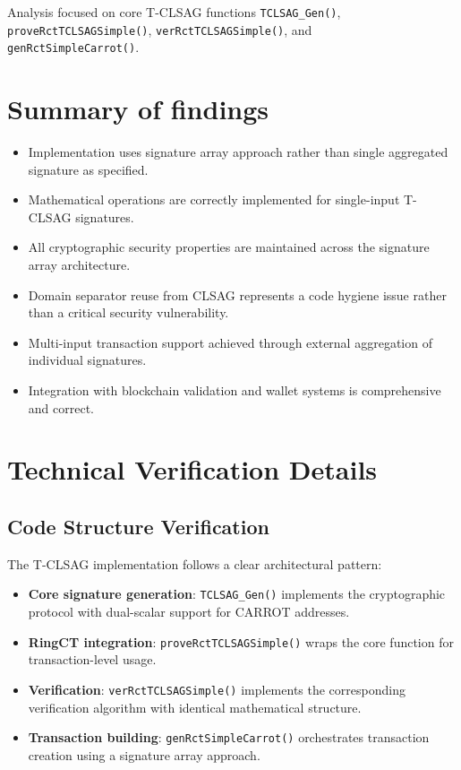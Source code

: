 \documentclass{article}
\begin{document}
Analysis focused on core T-CLSAG functions \texttt{TCLSAG\_Gen()}, \\
\texttt{proveRctTCLSAGSimple()}, \texttt{verRctTCLSAGSimple()}, and \\
\texttt{genRctSimpleCarrot()}.

\section{Summary of findings}
\begin{itemize}
  \item Implementation uses signature array approach rather than single 
        aggregated signature as specified.
  \item Mathematical operations are correctly implemented for single-input 
        T-CLSAG signatures.
  \item All cryptographic security properties are maintained across the 
        signature array architecture.
  \item Domain separator reuse from CLSAG represents a code hygiene issue 
        rather than a critical security vulnerability.
  \item Multi-input transaction support achieved through external aggregation 
        of individual signatures.
  \item Integration with blockchain validation and wallet systems is 
        comprehensive and correct.
\end{itemize}

\section{Technical Verification Details}

\subsection{Code Structure Verification}
The T-CLSAG implementation follows a clear architectural pattern:
\begin{itemize}
  \item \textbf{Core signature generation}: \texttt{TCLSAG\_Gen()} implements the cryptographic 
        protocol with dual-scalar support for CARROT addresses.
  \item \textbf{RingCT integration}: \texttt{proveRctTCLSAGSimple()} wraps the core function 
        for transaction-level usage.
  \item \textbf{Verification}: \texttt{verRctTCLSAGSimple()} implements the corresponding 
        verification algorithm with identical mathematical structure.
  \item \textbf{Transaction building}: \texttt{genRctSimpleCarrot()} orchestrates 
        transaction creation using a signature array approach.
\end{itemize}
\end{document}
